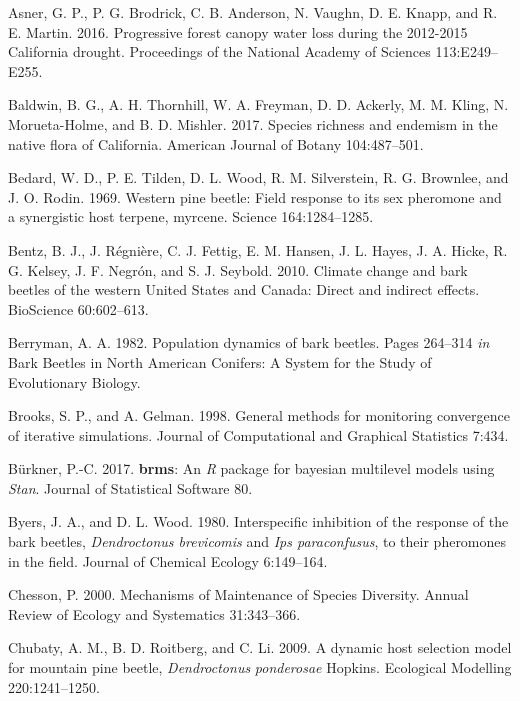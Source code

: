 \documentclass[]{article}
\begin{document}
\leavevmode\hypertarget{ref-asner2016}{}%
Asner, G. P., P. G. Brodrick, C. B. Anderson, N. Vaughn, D. E. Knapp,
and R. E. Martin. 2016. Progressive forest canopy water loss during the
2012-2015 California drought. Proceedings of the National Academy of
Sciences 113:E249--E255.

\leavevmode\hypertarget{ref-baldwin2017a}{}%
Baldwin, B. G., A. H. Thornhill, W. A. Freyman, D. D. Ackerly, M. M.
Kling, N. Morueta-Holme, and B. D. Mishler. 2017. Species richness and
endemism in the native flora of California. American Journal of Botany
104:487--501.

\leavevmode\hypertarget{ref-bedard1969}{}%
Bedard, W. D., P. E. Tilden, D. L. Wood, R. M. Silverstein, R. G.
Brownlee, and J. O. Rodin. 1969. Western pine beetle: Field response to
its sex pheromone and a synergistic host terpene, myrcene. Science
164:1284--1285.

\leavevmode\hypertarget{ref-bentz2010}{}%
Bentz, B. J., J. Régnière, C. J. Fettig, E. M. Hansen, J. L. Hayes, J.
A. Hicke, R. G. Kelsey, J. F. Negrón, and S. J. Seybold. 2010. Climate
change and bark beetles of the western United States and Canada: Direct
and indirect effects. BioScience 60:602--613.

\leavevmode\hypertarget{ref-berryman1982}{}%
Berryman, A. A. 1982. Population dynamics of bark beetles. Pages
264--314 \emph{in} Bark Beetles in North American Conifers: A System for
the Study of Evolutionary Biology.

\leavevmode\hypertarget{ref-brooks1998}{}%
Brooks, S. P., and A. Gelman. 1998. General methods for monitoring
convergence of iterative simulations. Journal of Computational and
Graphical Statistics 7:434.

\leavevmode\hypertarget{ref-burkner2017}{}%
Bürkner, P.-C. 2017. \textbf{brms}: An \emph{R} package for bayesian
multilevel models using \emph{Stan}. Journal of Statistical Software 80.

\leavevmode\hypertarget{ref-byers1980}{}%
Byers, J. A., and D. L. Wood. 1980. Interspecific inhibition of the
response of the bark beetles, \emph{Dendroctonus brevicomis} and
\emph{Ips paraconfusus}, to their pheromones in the field. Journal of
Chemical Ecology 6:149--164.

\leavevmode\hypertarget{ref-chesson2000}{}%
Chesson, P. 2000. Mechanisms of Maintenance of Species Diversity. Annual
Review of Ecology and Systematics 31:343--366.

\leavevmode\hypertarget{ref-chubaty2009}{}%
Chubaty, A. M., B. D. Roitberg, and C. Li. 2009. A dynamic host
selection model for mountain pine beetle, \emph{Dendroctonus}
\emph{ponderosae} Hopkins. Ecological Modelling 220:1241--1250.
\end{document}
